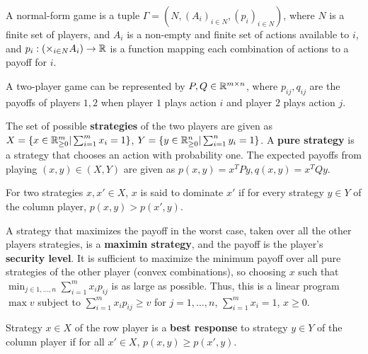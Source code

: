 \begin{defn}
  \label{sec:non-coop-games-1}
  A normal-form game is a tuple $\Gamma = (N, (A_{i})_{i \in N},
  (p_{i})_{i \in N})$, where $N$ is a finite set of players, and
  $A_{i}$ is a non-empty  and finite set of actions available to $i$,
  and $p_{i}: (\times_{i \in N} A_{i}) \rightarrow \mathbb{R}$ is a function
  mapping each combination of actions to a payoff for $i$.

  A two-player game can be represented by $P, Q \in \mathbb{R}^{m \times n}$,
  where $p_{ij}, q_{ij}$ are the payoffs of players $1, 2$ when player
  $1$ plays action $i$ and player $2$ plays action $j$.

  The set of possible \textbf{strategies} of the two players are given
  as $X = \{ x \in \mathbb{R}^{m}_{\geq 0} | \sum_{i=1}^{m} x_{i} = 1 \} $, $Y
  = \{ y \in \mathbb{R}^{n}_{\geq 0} | \sum_{i=1}^{n} y_{i} = 1 \}$. A
  \textbf{pure strategy} is a strategy that chooses an action with
  probability one. The expected payoffs from playing $(x, y) \in (X,
  Y)$ are given as $p(x, y) = x^{T} P y, q(x, y) = x^{T} Q y$.

  For two strategies $x, x' \in X$, $x$ is said to dominate $x'$ if
  for every strategy $y \in Y$ of the column player, $p(x, y) > p(x',
  y)$.

  A strategy that maximizes the payoff in the worst case, taken over
  all the other players strategies, is a \textbf{maximin strategy}, and
  the payoff is the player's \textbf{security level}.  It is
  sufficient to maximize the minimum payoff over all pure strategies
  of the other player (convex combinations), so choosing $x$ such that
  $\min_{j \in 1, \dots, n} \sum_{i=1}^{m} x_{i} p_{ij}$ is as large
  as possible.  Thus, this is a linear program $\max v$ subject to
  $\sum_{i=1}^{m} x_{i} p_{ij} \geq v$ for $j = 1, \dots, n$,
  $\sum_{i=1}^{m} x_{i} = 1$, $x \geq 0$.

  Strategy $x \in X$ of the row player is a \textbf{best response} to
  strategy $y \in Y$ of the column player if for all $x' \in X$, $p(x,
  y) \geq p(x', y)$.
\end{defn}

